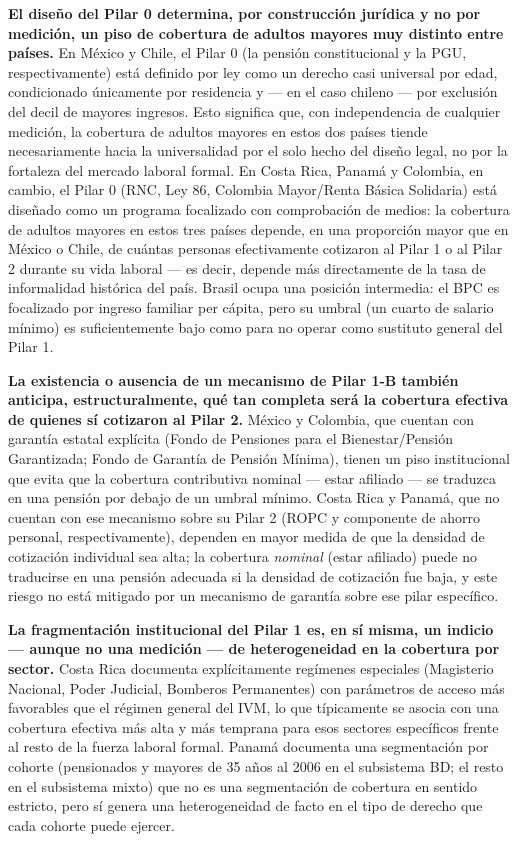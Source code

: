 \documentclass[12pt, letterpaper]{article}
\begin{document}
\textbf{El diseño del Pilar 0 determina, por construcción jurídica y no por medición, un piso de cobertura de adultos mayores muy distinto entre países.} En México y Chile, el Pilar 0 (la pensión constitucional y la PGU, respectivamente) está definido por ley como un derecho casi universal por edad, condicionado únicamente por residencia y --- en el caso chileno --- por exclusión del decil de mayores ingresos. Esto significa que, con independencia de cualquier medición, la cobertura de adultos mayores en estos dos países tiende necesariamente hacia la universalidad por el solo hecho del diseño legal, no por la fortaleza del mercado laboral formal. En Costa Rica, Panamá y Colombia, en cambio, el Pilar 0 (RNC, Ley 86, Colombia Mayor/Renta Básica Solidaria) está diseñado como un programa focalizado con comprobación de medios: la cobertura de adultos mayores en estos tres países depende, en una proporción mayor que en México o Chile, de cuántas personas efectivamente cotizaron al Pilar 1 o al Pilar 2 durante su vida laboral --- es decir, depende más directamente de la tasa de informalidad histórica del país. Brasil ocupa una posición intermedia: el BPC es focalizado por ingreso familiar per cápita, pero su umbral (un cuarto de salario mínimo) es suficientemente bajo como para no operar como sustituto general del Pilar 1.

\textbf{La existencia o ausencia de un mecanismo de Pilar 1-B también anticipa, estructuralmente, qué tan completa será la cobertura efectiva de quienes sí cotizaron al Pilar 2.} México y Colombia, que cuentan con garantía estatal explícita (Fondo de Pensiones para el Bienestar/Pensión Garantizada; Fondo de Garantía de Pensión Mínima), tienen un piso institucional que evita que la cobertura contributiva nominal --- estar afiliado --- se traduzca en una pensión por debajo de un umbral mínimo. Costa Rica y Panamá, que no cuentan con ese mecanismo sobre su Pilar 2 (ROPC y componente de ahorro personal, respectivamente), dependen en mayor medida de que la densidad de cotización individual sea alta; la cobertura \textit{nominal} (estar afiliado) puede no traducirse en una pensión adecuada si la densidad de cotización fue baja, y este riesgo no está mitigado por un mecanismo de garantía sobre ese pilar específico.

\textbf{La fragmentación institucional del Pilar 1 es, en sí misma, un indicio --- aunque no una medición --- de heterogeneidad en la cobertura por sector.} Costa Rica documenta explícitamente regímenes especiales (Magisterio Nacional, Poder Judicial, Bomberos Permanentes) con parámetros de acceso más favorables que el régimen general del IVM, lo que típicamente se asocia con una cobertura efectiva más alta y más temprana para esos sectores específicos frente al resto de la fuerza laboral formal. Panamá documenta una segmentación por cohorte (pensionados y mayores de 35 años al 2006 en el subsistema BD; el resto en el subsistema mixto) que no es una segmentación de cobertura en sentido estricto, pero sí genera una heterogeneidad de facto en el tipo de derecho que cada cohorte puede ejercer.
\end{document}
